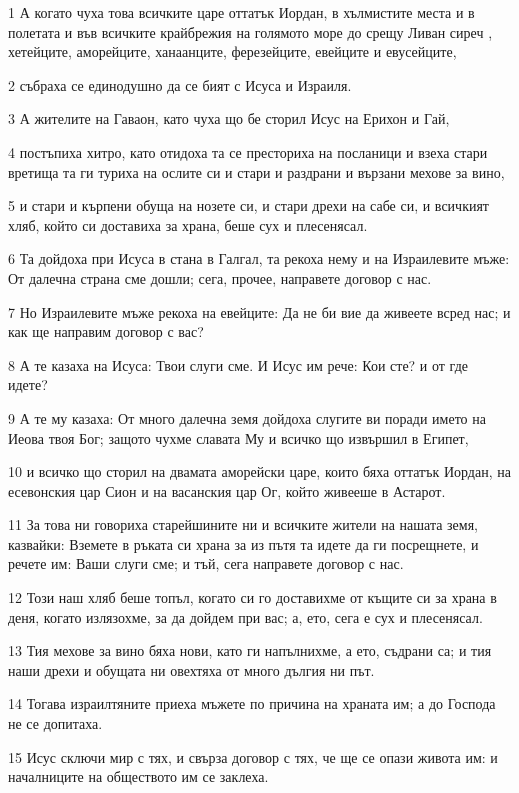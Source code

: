 \par 1 А когато чуха това всичките царе оттатък Иордан, в хълмистите места и в полетата и във всичките крайбрежия на голямото море до срещу Ливан сиреч , хетейците, аморейците, ханаанците, ферезейците, евейците и евусейците,
\par 2 събраха се единодушно да се бият с Исуса и Израиля.
\par 3 А жителите на Гаваон, като чуха що бе сторил Исус на Ерихон и Гай,
\par 4 постъпиха хитро, като отидоха та се престориха на посланици и взеха стари вретища та ги туриха на ослите си и стари и раздрани и вързани мехове за вино,
\par 5 и стари и кърпени обуща на нозете си, и стари дрехи на сабе си, и всичкият хляб, който си доставиха за храна, беше сух и плесенясал.
\par 6 Та дойдоха при Исуса в стана в Галгал, та рекоха нему и на Израилевите мъже: От далечна страна сме дошли; сега, прочее, направете договор с нас.
\par 7 Но Израилевите мъже рекоха на евейците: Да не би вие да живеете всред нас; и как ще направим договор с вас?
\par 8 А те казаха на Исуса: Твои слуги сме. И Исус им рече: Кои сте? и от где идете?
\par 9 А те му казаха: От много далечна земя дойдоха слугите ви поради името на Иеова твоя Бог; защото чухме славата Му и всичко що извършил в Египет,
\par 10 и всичко що сторил на двамата аморейски царе, които бяха оттатък Иордан, на есевонския цар Сион и на васанския цар Ог, който живееше в Астарот.
\par 11 За това ни говориха старейшините ни и всичките жители на нашата земя, казвайки: Вземете в ръката си храна за из пътя та идете да ги посрещнете, и речете им: Ваши слуги сме; и тъй, сега направете договор с нас.
\par 12 Този наш хляб беше топъл, когато си го доставихме от къщите си за храна в деня, когато излязохме, за да дойдем при вас; а, ето, сега е сух и плесенясал.
\par 13 Тия мехове за вино бяха нови, като ги напълнихме, а ето, съдрани са; и тия наши дрехи и обущата ни овехтяха от много дългия ни път.
\par 14 Тогава израилтяните приеха мъжете по причина на храната им; а до Господа не се допитаха.
\par 15 Исус сключи мир с тях, и свърза договор с тях, че ще се опази живота им: и началниците на обществото им се заклеха.
